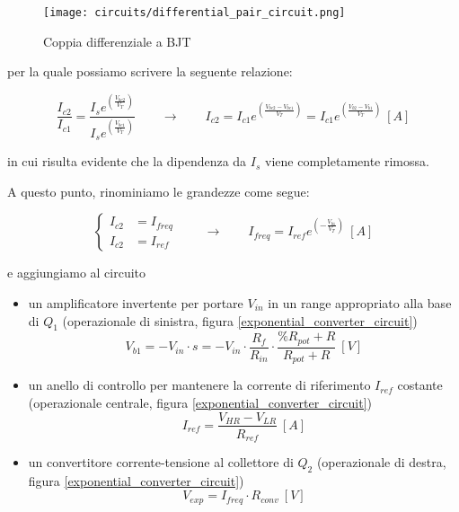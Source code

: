 \begin{figure}[H]
    \centering
    \texttt{[image: circuits/differential\_pair\_circuit.png]}
    \caption{Coppia differenziale a BJT}
    \label{differential_pair_circuit}
\end{figure}

per la quale possiamo scrivere la seguente relazione:

\begin{equation}\label{differential_pair}
    \frac{I_{c2}}{I_{c1}}=\frac{I_s e^{\left(\frac{V_{be2}}{V_T}\right)}}{I_s e^{\left(\frac{V_{be1}}{V_T}\right)}}
    \qquad
    \rightarrow
    \qquad
    I_{c2}=I_{c1}e^{\left(\frac{V_{be2}-V_{be1}}{V_T}\right)}=I_{c1}e^{\left(\frac{V_{b2}-V_{b1}}{V_T}\right)}\ [A]
\end{equation}

in cui risulta evidente che la dipendenza da $I_s$ viene completamente rimossa.

A questo punto, rinominiamo le grandezze come segue:

\begin{equation}\label{renamed_differential_pair}
    \left\{ \begin{aligned}
        I_{c2} & = I_{freq} \\
        I_{c2} & = I_{ref}
    \end{aligned} \right.
    \qquad
    \rightarrow
    \qquad
    I_{freq}=I_{ref}e^{\left(-\frac{V_{b1}}{V_T}\right)}\ [A]
\end{equation}

e aggiungiamo al circuito

\begin{itemize}
    \item un amplificatore invertente per portare $V_{in}$ in un range appropriato alla base
          di $Q_1$ (operazionale di sinistra, figura \ref{exponential_converter_circuit})
          \begin{equation}\label{amplifier}
              V_{b1}=-V_{in}\cdot s=
              -V_{in}\cdot\frac{R_f}{R_{in}}\cdot\frac{\%R_{pot}+R}{R_{pot}+R}\ [V]
          \end{equation}
    \item un anello di controllo per mantenere la corrente di riferimento $I_{ref}$ costante
          (operazionale centrale, figura \ref{exponential_converter_circuit})
          \begin{equation}\label{iref}
              I_{ref}=\frac{V_{HR}-V_{LR}}{R_{ref}}\ [A]
          \end{equation}
    \item un convertitore corrente-tensione al collettore di $Q_2$ (operazionale di destra,
          figura \ref{exponential_converter_circuit})
          \begin{equation}\label{ivconv}
              V_{exp}=I_{freq}\cdot R_{conv}\ [V]
          \end{equation}
\end{itemize}


